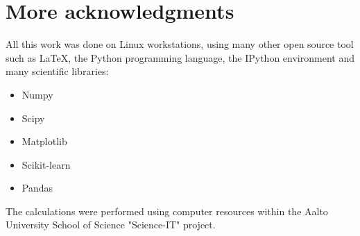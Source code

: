 \chapter{More acknowledgments}
\label{chap:ack}

All this work was done on Linux workstations, using many other open source tool
such as \LaTeX, the Python programming language, the IPython environment
\autocite{IPython07} and many scientific libraries:
\begin{itemize}
	\item Numpy \autocite{Numpy11}
	\item Scipy \autocite{Scipy14}
	\item Matplotlib \autocite{Matplotlib07}
	\item Scikit-learn \autocite{Scikit12}
	\item Pandas \autocite{Pandas10}
\end{itemize}

The calculations were performed using computer resources within the Aalto
University School of Science "Science-IT" project.

